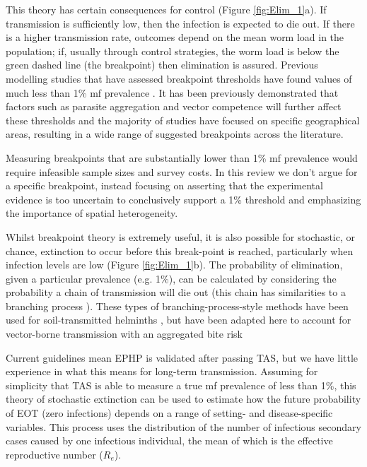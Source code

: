 This theory has certain consequences for control (Figure \ref{fig:Elim_1}a). If transmission is sufficiently low, then the infection is expected to die out. If there is a higher transmission rate, outcomes depend on the mean worm load in the population; if, usually through control strategies, the worm load is below the green dashed line (the breakpoint) then elimination is assured. Previous modelling studies that have assessed breakpoint thresholds have found values of much less than 1\% mf prevalence \cite{Singh2015,Michael2017,Michael2018,Gambhir2010}. It has been previously demonstrated that factors such as parasite aggregation and vector competence will further affect these thresholds \cite{irvine2015} and the majority of studies have focused on specific geographical areas, resulting in a wide range of suggested breakpoints across the literature.

Measuring breakpoints that are substantially lower than 1\% mf prevalence would require infeasible sample sizes and survey costs. In this review we don’t argue for a specific breakpoint, instead focusing on asserting that the experimental evidence is too uncertain to conclusively support a 1\% threshold and emphasizing the importance of spatial heterogeneity.

Whilst breakpoint theory is extremely useful, it is also possible for stochastic, or chance, extinction to occur before this break-point is reached, particularly when infection levels are low (Figure \ref{fig:Elim_1}b). The probability of elimination, given a particular prevalence (e.g. 1\%), can be calculated by considering the probability a chain of transmission will die out (this chain has similarities to a branching process \cite{Watson1875}). These types of branching-process-style methods have been used for soil-transmitted helminths \cite{Cornell2004_Stochastic,Cornell2004_Ultimate}, but have been adapted here to account for vector-borne transmission with an aggregated bite risk \cite{Fowler2016,Irvine2017_Mosquitobite}

Current guidelines mean EPHP is validated after passing TAS, but we have little experience in what this means for long-term transmission. Assuming for simplicity that TAS is able to measure a true mf prevalence of less than 1\%, this theory of stochastic extinction can be used to estimate how the future probability of EOT (zero infections) depends on a range of setting- and disease-specific variables. This process uses the distribution of the number of infectious secondary cases caused by one infectious individual, the mean of which is the effective reproductive number ($R_e$).

